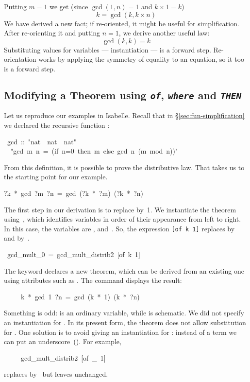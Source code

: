 Putting $m=1$ we get (since $\gcd(1,n)=1$ and $k\times1=k$) 
\[ k = \gcd(k,k\times n)\]
We have derived a new fact; if re-oriented, it might be
useful for simplification.  After re-orienting it and putting $n=1$, we
derive another useful law: 
\[ \gcd(k,k)=k \]
Substituting values for variables --- instantiation --- is a forward step. 
Re-orientation works by applying the symmetry of equality to 
an equation, so it too is a forward step.  

\subsection{Modifying a Theorem using {\tt\slshape of},  {\tt\slshape where}
 and {\tt\slshape THEN}}

\label{sec:THEN}

Let us reproduce our examples in Isabelle.  Recall that in
{\S}\ref{sec:fun-simplification} we declared the recursive function
:
\begin{isabelle}
\ gcd\ ::\ "nat\ \isasymRightarrow \ nat\ \isasymRightarrow \ nat"\ \isanewline
\ \ "gcd\ m\ n\ =\ (if\ n=0\ then\ m\ else\ gcd\ n\ (m\ mod\ n))"
\end{isabelle}
%
From this definition, it is possible to prove the distributive law.  
That takes us to the starting point for our example.
\begin{isabelle}
?k\ *\ gcd\ ?m\ ?n\ =\ gcd\ (?k\ *\ ?m)\ (?k\ *\ ?n)
\end{isabelle}
%
The first step in our derivation is to replace  by~1.  We instantiate the
theorem using~, which identifies variables in order of their
appearance from left to right.  In this case, the variables  are , 
and~. So, the expression
\hbox{\texttt{[of k 1]}} replaces  by~ and 
by~.
\begin{isabelle}
\ gcd_mult_0\ =\ gcd_mult_distrib2\ [of\ k\ 1]
\end{isabelle}
%
The keyword  declares a new theorem, which can be derived
from an existing one using attributes such as \isa{[of~k~1]}.
The command 
displays the result:
\begin{isabelle}
\ \ \ \ \ k\ *\ gcd\ 1\ ?n\ =\ gcd\ (k\ *\ 1)\ (k\ *\ ?n)
\end{isabelle}
Something is odd:  is an ordinary variable, while  
is schematic.  We did not specify an instantiation 
for .  In its present form, the theorem does not allow 
substitution for .  One solution is to avoid giving an instantiation for
: instead of a term we can put an underscore~(\isa{_}).  For example,
\begin{isabelle}
\ \ \ \ \ gcd_mult_distrib2\ [of\ _\ 1]
\end{isabelle}
replaces  by~ but leaves  unchanged.  

